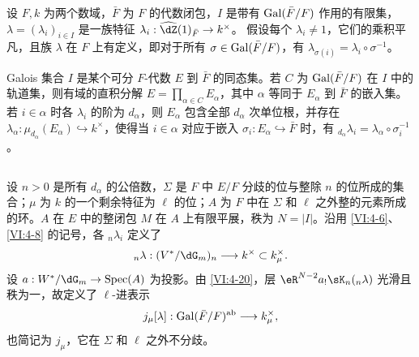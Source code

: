 设 $F,k$ 为两个数域，$\bar F$ 为 $F$ 的代数闭包，$I$ 是带有 $\operatorname{Gal}(\bar F/F)$ 作用的有限集，$\lambda=(\lambda_i)_{i\in I}$ 是一族特征
$\lambda_i:\widehat\dZ(1)_{\bar F}\to k^\times$。
假设每个 $\lambda_i\ne1$，它们的乘积平凡，且族 $\lambda$ 在 $F$ 上有定义，即对于所有 $\sigma\in\operatorname{Gal}(\bar F/F)$，有
$\lambda_{\sigma(i)}=\lambda_i\circ\sigma^{-1}$。

Galois 集合 $I$ 是某个可分 $F$-代数 $E$ 到 $\bar F$ 的同态集。若 $C$ 为 $\operatorname{Gal}(\bar F/F)$ 在 $I$ 中的轨道集，则有域的直积分解
$E=\prod_{\alpha\in C}E_\alpha$，其中 $\alpha$ 等同于 $E_\alpha$ 到 $\bar F$ 的嵌入集。若 $i\in\alpha$ 时各 $\lambda_i$ 的阶为 $d_\alpha$，则 $E_\alpha$ 包含全部 $d_\alpha$ 次单位根，并存在
$\lambda_\alpha:\mu_{d_\alpha}(E_\alpha)\hookrightarrow k^\times$，使得当 $i\in\alpha$ 对应于嵌入 $\sigma_i:E_\alpha\hookrightarrow\bar F$ 时，有
${}_{d_\alpha}\lambda_i=\lambda_\alpha\circ\sigma_i^{-1}$。

\subsection{}\label{VI:6-2}
设 $n>0$ 是所有 $d_\alpha$ 的公倍数，$\Sigma$ 是 $F$ 中 $E/F$ 分歧的位与整除 $n$ 的位所成的集合；$\mu$ 为 $k$ 的一个剩余特征为 $\ell$ 的位；$A$ 为 $F$ 中在 $\Sigma$ 和 $\ell$ 之外整的元素所成的环。$A$ 在 $E$ 中的整闭包 $M$ 在 $A$ 上有限平展，秩为 $N=|I|$。沿用 \ref{VI:4-6}、\ref{VI:4-8} 的记号，各 ${}_n\lambda_i$ 定义了
\[{}_n\lambda:(V^\ast/\dG_m)_n\longrightarrow k^\times\subset k_\mu^\times.\]
设 $a:W^\ast/\dG_m\to\spec(A)$ 为投影。由 \ref{VI:4-20}，层
$\eR^{N-2}a_!\sK_n({}_n\lambda)$ 光滑且秩为一，故定义了 $\ell$-进表示
\[j_\mu[\lambda]:\operatorname{Gal}(\bar F/F)^\text{ab}\longrightarrow k_\mu^\times,\]
也简记为 $j_\mu$，它在 $\Sigma$ 和 $\ell$ 之外不分歧。

